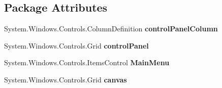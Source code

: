 \subsection*{Package Attributes}
\begin{DoxyCompactItemize}
\item 
\mbox{\label{class_teacher_handbook_1_1_main_window_ac36bb4fc2ccf9ed61ea2705b75aabc15}} 
System.\+Windows.\+Controls.\+Column\+Definition {\bfseries control\+Panel\+Column}
\item 
\mbox{\label{class_teacher_handbook_1_1_main_window_a39fb37d144a6d9efc57fc17b78321a1a}} 
System.\+Windows.\+Controls.\+Grid {\bfseries control\+Panel}
\item 
\mbox{\label{class_teacher_handbook_1_1_main_window_a83a05dbd21ff62a1bb244c1e83c5be54}} 
System.\+Windows.\+Controls.\+Items\+Control {\bfseries Main\+Menu}
\item 
\mbox{\label{class_teacher_handbook_1_1_main_window_a02d103e0b780385b00acf5494c63496a}} 
System.\+Windows.\+Controls.\+Grid {\bfseries canvas}
\end{DoxyCompactItemize}
